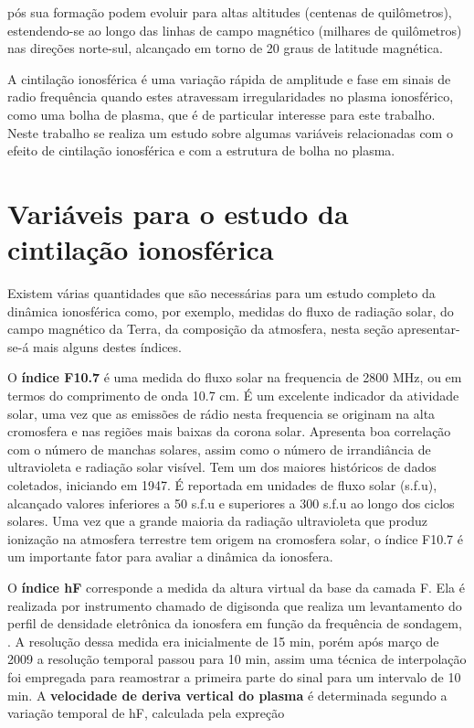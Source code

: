 pós sua formação podem evoluir para altas altitudes (centenas de quilômetros), estendendo-se ao longo das linhas de campo magnético (milhares de quilômetros) nas direções norte-sul, alcançado em torno de 20 graus de latitude magnética.


A cintilação ionosférica é uma variação rápida de amplitude e fase em sinais de radio frequência quando estes atravessam irregularidades no plasma ionosférico, como uma bolha de plasma, que é de particular interesse para este trabalho. Neste trabalho se realiza um estudo sobre algumas variáveis relacionadas com o efeito de cintilação ionosférica e com a estrutura de bolha no plasma.

\section{Variáveis para o estudo da cintilação ionosférica}

Existem várias quantidades que são necessárias para um estudo completo da dinâmica ionosférica como, por exemplo, medidas do fluxo de radiação solar, do campo magnético da Terra, da composição da atmosfera, nesta seção apresentar-se-á mais alguns destes índices.

O {\bf índice F10.7} é uma medida do fluxo solar na frequencia de 2800 MHz, ou em termos do comprimento de onda 10.7 cm. É um excelente indicador da atividade solar, uma vez que as emissões de rádio nesta frequencia se originam na alta cromosfera e nas regiões mais baixas da corona solar. Apresenta boa correlação com o número de manchas solares, assim como o número de irrandiância de ultravioleta e radiação solar visível. Tem um dos maiores históricos de dados coletados, iniciando em 1947. É reportada em unidades de fluxo solar (s.f.u), alcançado valores inferiores a 50 s.f.u e superiores a 300 s.f.u ao longo dos ciclos solares. Uma vez que a grande maioria da radiação ultravioleta que produz ionização na atmosfera terrestre tem origem na cromosfera solar, o índice F10.7 é um importante fator para avaliar a dinâmica da ionosfera.

O {\bf índice hF} corresponde a medida da altura virtual da base da camada F. Ela é realizada por instrumento chamado de digisonda que realiza um levantamento do perfil de densidade eletrônica da ionosfera em função da frequência de sondagem, \cite{BERTONI:1998}. A resolução dessa medida era inicialmente de 15 min, porém após março de 2009 a resolução temporal passou para 10 min, assim uma técnica de interpolação foi empregada para reamostrar a primeira parte do sinal para um intervalo de 10 min. A {\bf velocidade de deriva vertical do plasma} é determinada segundo a variação temporal de hF, calculada pela expreção

